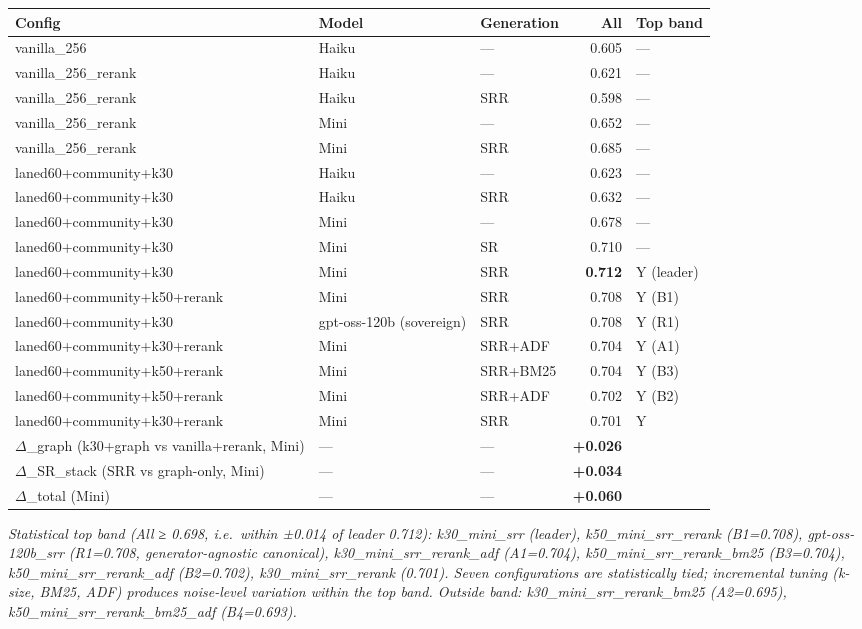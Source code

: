 \begin{small}
\setlength{\tabcolsep}{4pt}
\begin{longtable}{p{2.2in}p{1.3in}p{0.7in}rp{0.8in}}
\toprule
\textbf{Config} & \textbf{Model} & \textbf{Generation} & \textbf{All} & \textbf{Top band} \\
\midrule
\endhead
vanilla\_256 & Haiku & — & 0.605 & — \\
vanilla\_256\_rerank & Haiku & — & 0.621 & — \\
vanilla\_256\_rerank & Haiku & SRR & 0.598 & — \\
vanilla\_256\_rerank & Mini & — & 0.652 & — \\
vanilla\_256\_rerank & Mini & SRR & 0.685 & — \\
laned60+community+k30 & Haiku & — & 0.623 & — \\
laned60+community+k30 & Haiku & SRR & 0.632 & — \\
laned60+community+k30 & Mini & — & 0.678 & — \\
laned60+community+k30 & Mini & SR & 0.710 & — \\
laned60+community+k30 & Mini & SRR & \textbf{0.712} & Y (leader) \\
laned60+community+k50+rerank & Mini & SRR & 0.708 & Y (B1) \\
laned60+community+k30 & gpt-oss-120b (sovereign) & SRR & 0.708 & Y (R1) \\
laned60+community+k30+rerank & Mini & SRR+ADF & 0.704 & Y (A1) \\
laned60+community+k50+rerank & Mini & SRR+BM25 & 0.704 & Y (B3) \\
laned60+community+k50+rerank & Mini & SRR+ADF & 0.702 & Y (B2) \\
laned60+community+k30+rerank & Mini & SRR & 0.701 & Y \\
\midrule
$\Delta$\_graph (k30+graph vs vanilla+rerank, Mini) & — & — & \textbf{+0.026} & \\
$\Delta$\_SR\_stack (SRR vs graph-only, Mini) & — & — & \textbf{+0.034} & \\
$\Delta$\_total (Mini) & — & — & \textbf{+0.060} & \\
\bottomrule
\end{longtable}
\end{small}

\emph{Statistical top band (All ≥ 0.698, i.e.~within ±0.014 of leader 0.712): k30\_mini\_srr (leader), k50\_mini\_srr\_rerank (B1=0.708), gpt-oss-120b\_srr (R1=0.708, generator-agnostic canonical), k30\_mini\_srr\_rerank\_adf (A1=0.704), k50\_mini\_srr\_rerank\_bm25 (B3=0.704), k50\_mini\_srr\_rerank\_adf (B2=0.702), k30\_mini\_srr\_rerank (0.701). Seven configurations are statistically tied; incremental tuning (k-size, BM25, ADF) produces noise-level variation within the top band. Outside band: k30\_mini\_srr\_rerank\_bm25 (A2=0.695), k50\_mini\_srr\_rerank\_bm25\_adf (B4=0.693).}

